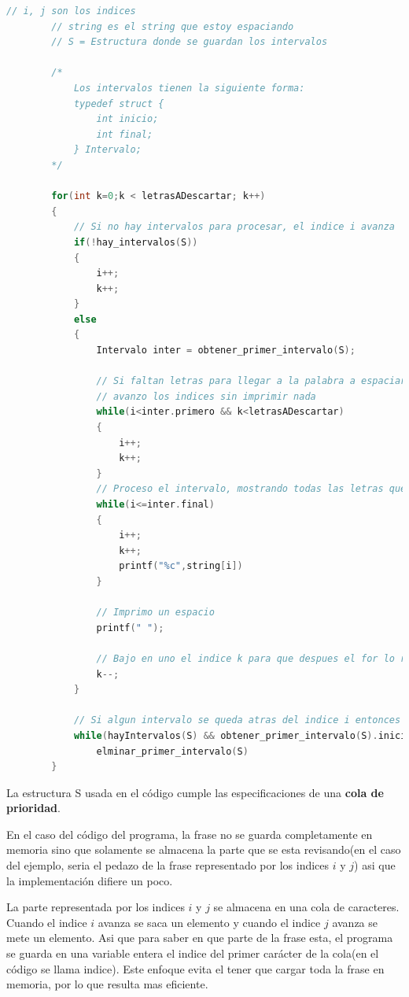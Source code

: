 \documentclass{article}
\begin{document}
\begin{lstlisting}[language=C]
        // i, j son los indices
        // string es el string que estoy espaciando
        // S = Estructura donde se guardan los intervalos
        
        /*
            Los intervalos tienen la siguiente forma:
            typedef struct {
                int inicio;
                int final;
            } Intervalo;
        */

        for(int k=0;k < letrasADescartar; k++)
        {
            // Si no hay intervalos para procesar, el indice i avanza
            if(!hay_intervalos(S))
            {
                i++;
                k++;
            }
            else
            {
                Intervalo inter = obtener_primer_intervalo(S);

                // Si faltan letras para llegar a la palabra a espaciar,
                // avanzo los indices sin imprimir nada
                while(i<inter.primero && k<letrasADescartar)
                {
                    i++;
                    k++;
                }
                // Proceso el intervalo, mostrando todas las letras que representa
                while(i<=inter.final)
                {
                    i++;
                    k++;
                    printf("%c",string[i])
                }

                // Imprimo un espacio
                printf(" ");

                // Bajo en uno el indice k para que despues el for lo reestablezca
                k--;
            }

            // Si algun intervalo se queda atras del indice i entonces hay que eliminarlo
            while(hayIntervalos(S) && obtener_primer_intervalo(S).inicio < i)
                elminar_primer_intervalo(S)
        }
\end{lstlisting}

La estructura S usada en el código cumple las especificaciones de una \textbf{cola de prioridad}.

En el caso del código del programa, la frase no se guarda completamente en memoria sino que solamente se almacena la parte que se
esta revisando(en el caso del ejemplo, seria el pedazo de la frase representado por los indices $i$ y $j$) asi que la implementación difiere un poco.

La parte representada por los indices $i$ y $j$ se almacena en una cola de caracteres. Cuando el indice $i$ avanza se saca un elemento y cuando el indice $j$ avanza
se mete un elemento. Asi que para saber en que parte de la frase esta, el programa se guarda en una variable entera el indice del primer carácter de la cola(en el código
se llama indice). Este enfoque evita el tener que cargar toda la frase en memoria, por lo que resulta mas eficiente.
\end{document}

